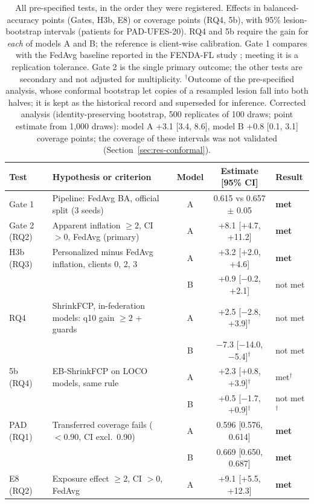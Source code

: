 \begin{table}[!t]
\centering
\caption{All pre-specified tests, in the order they were registered. Effects in balanced-accuracy points
(Gates, H3b, E8) or coverage points (RQ4, 5b), with 95\% lesion-bootstrap intervals (patients for
PAD-UFES-20). RQ4 and 5b require the gain for \emph{each} of models A and B; the reference is client-wise
calibration. Gate 1 compares with the FedAvg baseline reported in the FENDA-FL study
\cite{tavakoli2024fendafl}; meeting it is a replication tolerance. Gate 2 is the single primary outcome;
the other tests are secondary and not adjusted for multiplicity. $^\dagger$Outcome of the pre-specified
analysis, whose conformal bootstrap let copies of a resampled lesion fall into both halves; it is kept as the
historical record and superseded for inference. Corrected analysis (identity-preserving bootstrap, 500 replicates
of 100 draws; point estimate from 1,000 draws): model A +3.1 [3.4, 8.6], model B +0.8 [0.1, 3.1]
coverage points; the coverage of these intervals was not validated (Section~\ref{sec:res-conformal}).}
\label{tab:scorecard}
\begin{tabular}{@{}llccl@{}}
\toprule
Test & Hypothesis or criterion & Model & Estimate [95\% CI] & Result \\
\midrule
Gate 1 & Pipeline: FedAvg BA, official split (3 seeds) & A & 0.615 vs 0.657 $\pm$ 0.05 & \textbf{met} \\
Gate 2 (RQ2) & Apparent inflation $\ge 2$, CI $>0$, FedAvg (primary) & A & +8.1 [+4.7, +11.2] & \textbf{met} \\
H3b (RQ3) & Personalized minus FedAvg inflation, clients 0, 2, 3 & A & +3.2 [+2.0, +4.6] & \textbf{met} \\
 &  & B & +0.9 [$-$0.2, +2.1] & not met \\
RQ4 & ShrinkFCP, in-federation models: q10 gain $\ge 2$ + guards & A & +2.5 [$-$2.8, +3.9]$^\dagger$ & not met \\
 &  & B & $-$7.3 [$-$14.0, $-$5.4]$^\dagger$ & not met \\
5b (RQ4) & EB-ShrinkFCP on LOCO models, same rule & A & +2.3 [+0.8, +3.9]$^\dagger$ & met$^\dagger$ \\
 &  & B & +0.5 [$-$1.7, +0.9]$^\dagger$ & not met$^\dagger$ \\
PAD (RQ1) & Transferred coverage fails ($<0.90$, CI excl.\ 0.90) & A & 0.596 [0.576, 0.614] & \textbf{met} \\
 &  & B & 0.669 [0.650, 0.687] & \textbf{met} \\
E8 (RQ2) & Exposure effect $\ge 2$, CI $>0$, FedAvg & A & +9.1 [+5.5, +12.3] & \textbf{met} \\
\bottomrule
\end{tabular}
\end{table}
